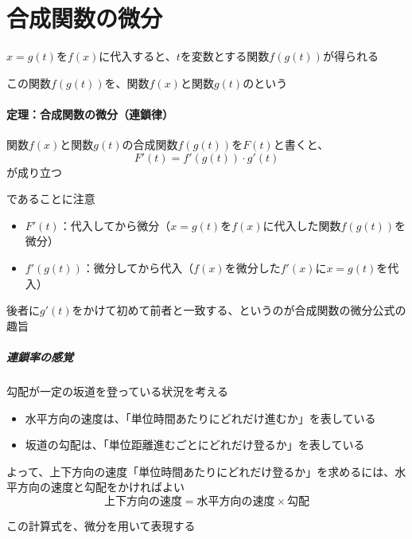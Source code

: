 \documentclass[../book_jiriki_calc]{subfiles}
\begin{document}
\section{合成関数の微分}

$x=g(t)$を$f(x)$に代入すると、$t$を変数とする関数$f(g(t))$が得られる

この関数$f(g(t))$を、関数$f(x)$と関数$g(t)$のという

\sectionline

\paragraph{定理：合成関数の微分（連鎖律）}\quad

関数$f(x)$と関数$g(t)$の合成関数$f(g(t))$を$F(t)$と書くと、
\begin{equation}
  F'(t) = f'(g(t)) \cdot g'(t)
\end{equation}
が成り立つ

\sectionline

であることに注意

\begin{itemize}
  \item $F'(t)$：代入してから微分（$x=g(t)$を$f(x)$に代入した関数$f(g(t))$を微分）
  \item $f'(g(t))$：微分してから代入（$f(x)$を微分した$f'(x)$に$x=g(t)$を代入）
\end{itemize}

後者に$g'(t)$をかけて初めて前者と一致する、というのが合成関数の微分公式の趣旨

\sectionline

\subparagraph{連鎖率の感覚}

勾配が一定の坂道を登っている状況を考える

\begin{itemize}
  \item 水平方向の速度は、「単位時間あたりにどれだけ進むか」を表している
  \item 坂道の勾配は、「単位距離進むごとにどれだけ登るか」を表している
\end{itemize}

よって、上下方向の速度「単位時間あたりにどれだけ登るか」を求めるには、水平方向の速度と勾配をかければよい
\begin{equation}
  \text{上下方向の速度} = \text{水平方向の速度} \times \text{勾配}
\end{equation}

この計算式を、微分を用いて表現する
\end{document}

